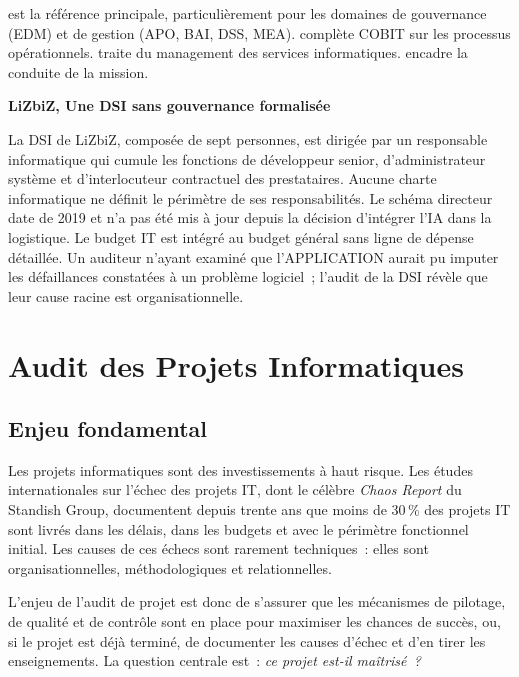  est la référence principale, particulièrement pour les domaines
de gouvernance (EDM) et de gestion (APO, BAI, DSS, MEA).  complète
COBIT sur les processus opérationnels.  traite du management
des services informatiques.  encadre la conduite de la mission.

\begin{boxlizbiz}
\textbf{LiZbiZ, Une DSI sans gouvernance formalisée}

La DSI de LiZbiZ, composée de sept personnes, est dirigée par un responsable
informatique qui cumule les fonctions de développeur senior, d'administrateur
système et d'interlocuteur contractuel des prestataires. Aucune charte informatique
ne définit le périmètre de ses responsabilités. Le schéma directeur date de 2019
et n'a pas été mis à jour depuis la décision d'intégrer l'IA dans la logistique.
Le budget IT est intégré au budget général sans ligne de dépense détaillée. Un
auditeur n'ayant examiné que l'APPLICATION aurait pu imputer les défaillances
constatées à un problème logiciel~; l'audit de la DSI révèle que leur cause racine
est organisationnelle.
\end{boxlizbiz}


\section{Audit des Projets Informatiques}
\label{sec:audit-projets}

\subsection{Enjeu fondamental}

Les projets informatiques sont des investissements à haut risque. Les études
internationales sur l'échec des projets IT, dont le célèbre \textit{Chaos Report}
du Standish Group, documentent depuis trente ans que moins de 30\,\% des projets IT
sont livrés dans les délais, dans les budgets et avec le périmètre fonctionnel initial.
Les causes de ces échecs sont rarement techniques~: elles sont organisationnelles,
méthodologiques et relationnelles.

L'enjeu de l'audit de projet est donc de s'assurer que les mécanismes de pilotage,
de qualité et de contrôle sont en place pour maximiser les chances de succès, ou,
si le projet est déjà terminé, de documenter les causes d'échec et d'en tirer les
enseignements. La question centrale est~: \textit{ce projet est-il maîtrisé~?}

